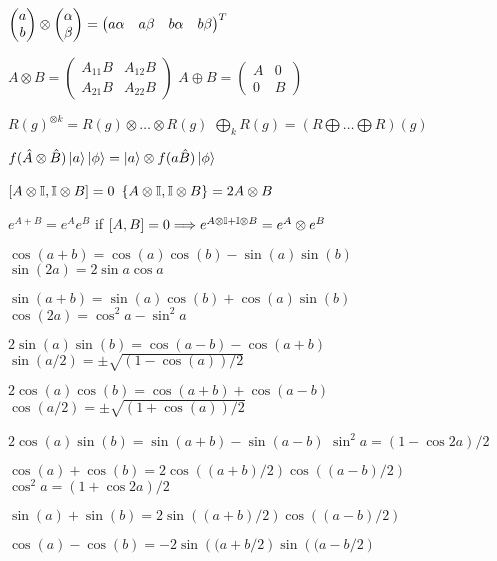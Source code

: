 \begin{squishlist}
\item $\begin{pmatrix} a \\ b \end{pmatrix} \otimes \begin{pmatrix} \alpha \\ \beta \end{pmatrix} = \begin{pmatrix} a \alpha & a \beta & b \alpha & b \beta \end{pmatrix}^T$
    
\item $A \otimes B = \begin{pmatrix} A_{11}B & A_{12}B \\ A_{21}B & A_{22}B \end{pmatrix}$
\squishsep $A \oplus B = \begin{pmatrix} A & 0 \\ 0 & B \end{pmatrix}$

\item $R(g)^{\otimes k} = R(g) \otimes \ldots \otimes R(g)$ \squishsep $\bigoplus_k R(g) = (R \bigoplus \ldots \bigoplus R)(g)$

\item $f(\hat{A} \otimes \hat{B}) \ket{a}\ket{\phi} = \ket{a} \otimes f(a\hat{B})\ket{\phi}$
\item $[A \otimes \mathbb{I}, \mathbb{I} \otimes B] = 0$ \squishsep $\{A \otimes \mathbb{I} , \mathbb{I} \otimes B \} = 2 A \otimes B$
\item $e^{A+B} = e^Ae^B$ if $[A,B]=0 \Longrightarrow e^{A\otimes \mathbb{I} + \mathbb{I} \otimes B} = e^A \otimes e^B$
\end{squishlist}


\begin{squishlist}
    
    \item $\cos(a+b) = \cos(a)\cos(b)-\sin(a)\sin(b)$ \squishsep $\sin(2a) = 2\sin a \cos a$
    \item $\sin(a+b) = \sin(a)\cos(b) + \cos(a)\sin(b)$ \squishsep $\cos(2a) = \cos^2 a - \sin^2 a$
    \item $2\sin(a)\sin(b) = \cos(a-b) - \cos(a+b)$ \smallsquishsep $\sin(a/2) = \pm \sqrt{(1-\cos(a))/2}$
    \item $2\cos(a)\cos(b) = \cos(a+b) + \cos(a-b)$ \smallsquishsep $\cos(a/2) = \pm \sqrt{(1+\cos(a))/2}$
    \item $2\cos(a)\sin(b) = \sin(a+b) - \sin(a-b)$ \smallsquishsep $\sin^2a = (1-\cos 2a)/2$
    \item $\cos(a) + \cos(b) = 2\cos\left((a+b)/2\right)\cos\left((a-b)/2\right)$ \;\squishitem \; $\cos^2 a = (1+\cos 2a) / 2$
    \item $\sin(a) + \sin(b) = 2\sin\left((a+b)/2\right)\cos\left((a-b)/2\right)$ 
    \item $\cos(a) - \cos(b) = -2\sin\left((a+b/2\right)\sin\left((a-b/2\right)$ 
\end{squishlist} 

